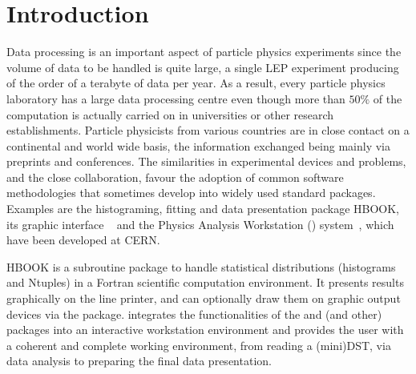 
\chapter{Introduction}       
\label{HINTRO}
 
Data processing is an important aspect of particle physics experiments
since the volume of data to be handled is quite large, a single LEP 
experiment producing of the order of a terabyte of data per year.
As a result, every particle physics laboratory has a large data 
processing centre even though more than $50\%$ of the computation is
actually carried on in universities or other research establishments.  
Particle physicists from various countries are in close contact on 
a continental and world wide basis,
the information exchanged being mainly via preprints and conferences.
The similarities in experimental devices and problems, and the close
collaboration, favour the adoption of common software methodologies that
sometimes develop into widely used standard packages. 
Examples are the histograming, fitting and data presentation package HBOOK, its
graphic interface \HPLOT~\cite{bib-HIGZHPLOT} and the
Physics Analysis Workstation (\PAW) system~\cite{bib-PAW}, 
which have been developed at CERN.

HBOOK is a subroutine package to handle statistical distributions
(histograms and Ntuples) in a Fortran scientific computation environment. 
It presents results graphically on the line printer, and can
optionally draw them on graphic output devices via the \HPLOT{}
package.
\PAW{} integrates the functionalities of the \HBOOK{} 
and \HPLOT{} (and other) packages
into an interactive workstation environment and provides the 
user with a coherent and complete working environment, 
from reading a (mini)DST,
via data analysis to preparing the final data presentation.

